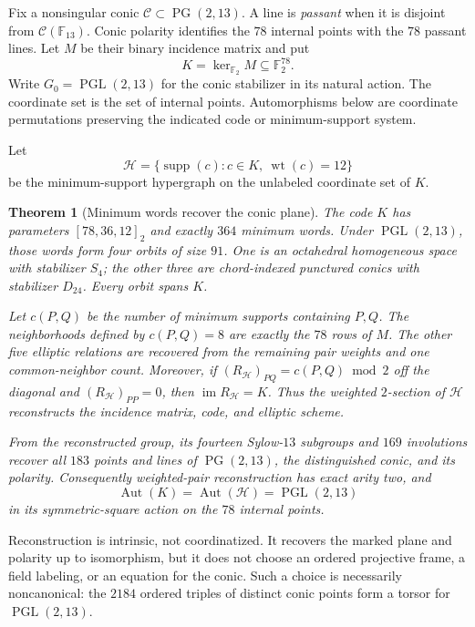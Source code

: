 \documentclass[11pt]{article}
\newtheorem{theorem}{Theorem}[section]
\theoremstyle{definition}
\theoremstyle{remark}
\newcommand{\F}{\mathbb F}
\newcommand{\PG}{\operatorname{PG}}
\newcommand{\PGL}{\operatorname{PGL}}
\newcommand{\Aut}{\operatorname{Aut}}
\newcommand{\cC}{\mathcal C}
\newcommand{\supp}{\operatorname{supp}}
\begin{document}
Fix a nonsingular conic \(\cC\subset\PG(2,13)\).  A line is
\emph{passant} when it is disjoint from \(\cC(\F_{13})\).  Conic polarity
identifies the \(78\) internal points with the \(78\) passant lines.  Let
\(M\) be their binary incidence matrix and put
\[
 K=\ker_{\F_2}M\subseteq\F_2^{78}.
\]
Write \(G_0=\PGL(2,13)\) for the conic stabilizer in its natural action.
The coordinate set is the set of internal points.  Automorphisms below are
coordinate permutations preserving the indicated code or minimum-support
system.

Let
\[
 \mathcal H=\{\supp(c):c\in K,\ \operatorname{wt}(c)=12\}
\]
be the minimum-support hypergraph on the unlabeled coordinate set of \(K\).

\begin{theorem}[Minimum words recover the conic plane]
\label{thm:main}
The code \(K\) has parameters \([78,36,12]_2\) and exactly \(364\)
minimum words.  Under \(\PGL(2,13)\), those words form four orbits of
size \(91\).  One is an octahedral homogeneous space with stabilizer
\(S_4\); the other three are chord-indexed punctured conics with stabilizer
\(D_{24}\).  Every orbit spans \(K\).

Let \(c(P,Q)\) be the number of minimum supports containing \(P,Q\).
The neighborhoods defined by \(c(P,Q)=8\) are exactly the \(78\) rows of
\(M\).  The other five elliptic relations are recovered from the remaining
pair weights and one common-neighbor count.  Moreover, if
\((R_{\mathcal H})_{PQ}=c(P,Q)\bmod2\) off the diagonal and
\((R_{\mathcal H})_{PP}=0\), then
\(\operatorname{im}R_{\mathcal H}=K\).  Thus the weighted \(2\)-section of
\(\mathcal H\) reconstructs the incidence matrix, code, and elliptic scheme.

From the reconstructed group, its fourteen Sylow-\(13\) subgroups and
\(169\) involutions recover all \(183\) points and lines of
\(\PG(2,13)\), the distinguished conic, and its polarity.  Consequently
weighted-pair reconstruction has exact arity two, and
\[
 \Aut(K)=\Aut(\mathcal H)=\PGL(2,13)
\]
in its symmetric-square action on the \(78\) internal points.
\end{theorem}

Reconstruction is intrinsic, not coordinatized.  It recovers the marked
plane and polarity up to isomorphism, but it does not choose an ordered
projective frame, a field labeling, or an equation for the conic.  Such a
choice is necessarily noncanonical: the \(2184\) ordered triples of distinct
conic points form a torsor for \(\PGL(2,13)\).
\end{document}
